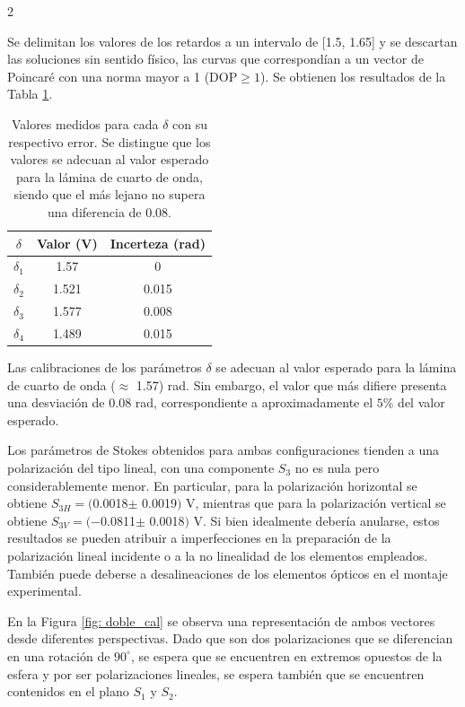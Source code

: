 \documentclass[11pt,a4paper]{article}
\begin{document}
\begin{multicols}{2}


\noindent Se delimitan los valores de los retardos a un intervalo de [1.5, 1.65]  y se descartan las soluciones sin sentido físico, las curvas que correspondían a un vector de Poincaré con una norma mayor a 1 ($\mathrm{DOP} \geq 1$). Se obtienen los resultados de la Tabla \ref{tab: cal_deltas}.

\begin{table}[H]
\centering
\begin{tabular}{ccc}
\hline
$\delta$ & Valor (V) & Incerteza (rad) \\
\hline
$\delta_1$  & 1.57 & 0 \\
$\delta_2$  & 1.521 & 0.015 \\
$\delta_3$  & 1.577 & 0.008 \\
$\delta_4$ & 1.489  & 0.015 \\
\hline
\end{tabular}
\caption{Valores medidos para cada $\delta$ con su respectivo error. Se distingue que los valores se adecuan al valor esperado para la lámina de cuarto de onda, siendo que el más lejano no supera una diferencia de 0.08.}\label{tabla: deltas}
\label{tab: cal_deltas}
\end{table}

Las calibraciones de los parámetros $\delta$ se adecuan al valor esperado para la lámina de cuarto de onda ($\approx$ 1.57) rad.  Sin embargo, el valor que más difiere presenta una desviación de 0.08 rad, correspondiente a aproximadamente el $5\%$ del valor esperado. %

Los parámetros de Stokes obtenidos para ambas configuraciones tienden a  una polarización del tipo lineal, con una componente $S_3$ no es nula pero considerablemente menor. En particular, para la polarización horizontal se obtiene $S_{3H}=($0.0018$\pm$ 0.0019$)$ V, mientras que para la polarización vertical se obtiene $S_{3V}=(-$0.0811$\pm$ 0.0018$)$ V. Si bien idealmente debería anularse, estos resultados se pueden atribuir a imperfecciones en la preparación de la polarización lineal incidente o a la no linealidad de los elementos empleados. También puede deberse a desalineaciones de los elementos ópticos en el montaje experimental.

En la Figura \ref{fig: doble_cal}  se observa una representación de ambos vectores desde diferentes perspectivas. Dado que son dos polarizaciones que se diferencian en una rotación de $90^\circ$, se espera que se encuentren en extremos opuestos de la esfera y por ser polarizaciones lineales, se espera también que se encuentren contenidos en el plano $S_1 $ y $S_2$.

\end{multicols}
\end{document}
